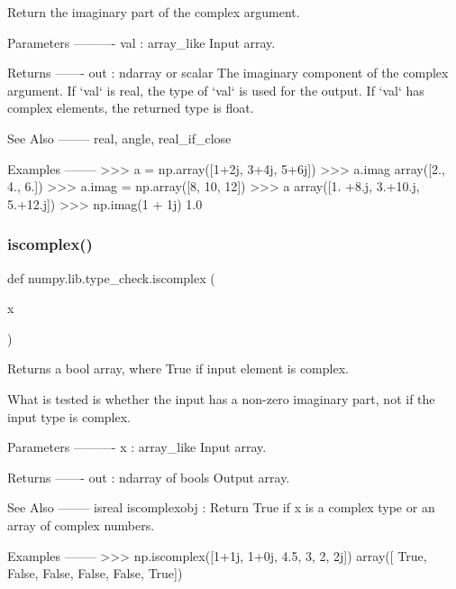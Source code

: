 \begin{DoxyVerb}Return the imaginary part of the complex argument.

Parameters
----------
val : array_like
    Input array.

Returns
-------
out : ndarray or scalar
    The imaginary component of the complex argument. If `val` is real,
    the type of `val` is used for the output.  If `val` has complex
    elements, the returned type is float.

See Also
--------
real, angle, real_if_close

Examples
--------
>>> a = np.array([1+2j, 3+4j, 5+6j])
>>> a.imag
array([2.,  4.,  6.])
>>> a.imag = np.array([8, 10, 12])
>>> a
array([1. +8.j,  3.+10.j,  5.+12.j])
>>> np.imag(1 + 1j)
1.0\end{DoxyVerb}
 \mbox{\label{namespacenumpy_1_1lib_1_1type__check_a01ec19c6332adc2ec94f0faac9fa0df8}} 
\subsubsection{\texorpdfstring{iscomplex()}{iscomplex()}}
{\footnotesize\ttfamily def numpy.\+lib.\+type\+\_\+check.\+iscomplex (\begin{DoxyParamCaption}\item[{}]{x }\end{DoxyParamCaption})}

\begin{DoxyVerb}Returns a bool array, where True if input element is complex.

What is tested is whether the input has a non-zero imaginary part, not if
the input type is complex.

Parameters
----------
x : array_like
    Input array.

Returns
-------
out : ndarray of bools
    Output array.

See Also
--------
isreal
iscomplexobj : Return True if x is a complex type or an array of complex
               numbers.

Examples
--------
>>> np.iscomplex([1+1j, 1+0j, 4.5, 3, 2, 2j])
array([ True, False, False, False, False,  True])\end{DoxyVerb}
 \mbox{\label{namespacenumpy_1_1lib_1_1type__check_ab1056475395022325c9780521c226336}} 
